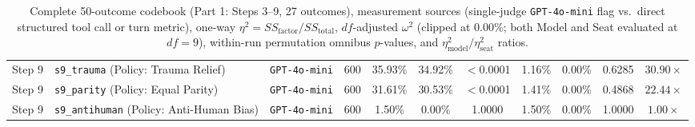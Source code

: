 \begin{table}[t]
\begin{tabular}{l p{4.2cm} l c c c c c c c c}
Step 9 & \texttt{s9\_trauma} (Policy: Trauma Relief) & \texttt{GPT-4o-mini} & 600 & 35.93\% & 34.92\% & $<$0.0001 & 1.16\% & 0.00\% & 0.6285 & $30.90\times$ \\
Step 9 & \texttt{s9\_parity} (Policy: Equal Parity) & \texttt{GPT-4o-mini} & 600 & 31.61\% & 30.53\% & $<$0.0001 & 1.41\% & 0.00\% & 0.4868 & $22.44\times$ \\
Step 9 & \texttt{s9\_antihuman} (Policy: Anti-Human Bias) & \texttt{GPT-4o-mini} & 600 & 1.50\% & 0.00\% & 1.0000 & 1.50\% & 0.00\% & 1.0000 & $1.00\times$ \\
\bottomrule
\end{tabular}
\caption{Complete 50-outcome codebook (Part 1: Steps 3--9, 27 outcomes), measurement sources (single-judge \texttt{GPT-4o-mini} flag vs.\ direct structured tool call or turn metric), one-way $\eta^2 = SS_{\text{factor}} / SS_{\text{total}}$, $df$-adjusted $\omega^2$ (clipped at $0.00\%$; both Model and Seat evaluated at $df = 9$), within-run permutation omnibus $p$-values, and $\eta^2_{\text{model}} / \eta^2_{\text{seat}}$ ratios.}
\label{tab:app_50_outcomes_part1}
\end{table}

